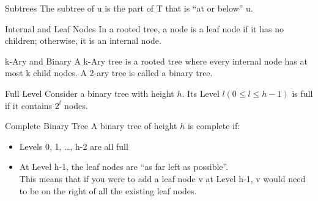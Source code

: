 \documentclass{lecture}
\begin{document}
\begin{landscape}
\begin{multicols}{2}
    \vfill
    \begin{note}{Subtrees}
        The subtree of u is the part of T that is ``at or below'' u.
    \end{note}
    \vfill
    \begin{note}{Internal and Leaf Nodes}
        In a rooted tree, a node is a leaf node if it has no children; otherwise, it is an internal node.
    \end{note}
    \vfill
    \begin{note}{k-Ary and Binary}
        A k-Ary tree is a rooted tree where every internal node has at most k child nodes. A 2-ary tree is called a binary tree.
    \end{note}
    \begin{note}{Full Level}
        Consider a binary tree with height $h$. Its Level $l (0\leq l \leq h-1)$ is full if it contains $2^l$ nodes.
    \end{note}
    \vfill
    \begin{note}{Complete Binary Tree}
        A binary tree of height $h$ is complete if:
        \begin{itemize}
            \item Levels 0, 1, \ldots, h-2 are all full
            \item At Level h-1, the leaf nodes are ``as far left as possible''.\\
                This means that if you were to add a leaf node v at Level h-1, v would need to be on the right of all the existing leaf nodes.
        \end{itemize}
    \end{note}

\end{multicols}

\end{landscape}
\end{document}
